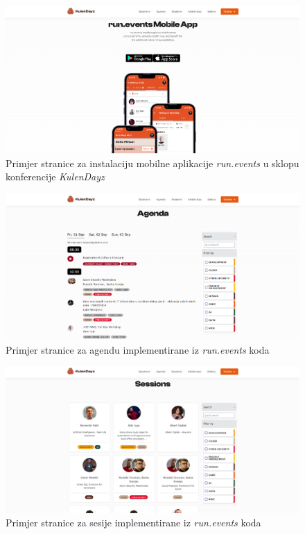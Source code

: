 		\begin{figure}
			\centering
			\includegraphics[width=1\linewidth]{slike/kulen-runevents.png}
			\caption{Primjer stranice za instalaciju mobilne aplikacije \textit{run.events} u sklopu konferencije \textit{KulenDayz}}
			\label{fig:kulen-run}
		\end{figure}
		
		\begin{figure}
			\centering
			\includegraphics[width=1\linewidth]{slike/kulen-agenda.png}
			\caption{Primjer stranice za agendu implementirane iz \textit{run.events} koda}
			\label{fig:kulen-agenda}
		\end{figure}
		
		\begin{figure}
			\centering
			\includegraphics[width=1\linewidth]{slike/kulen-sessions.png}
			\caption{Primjer stranice za sesije implementirane iz \textit{run.events} koda}
			\label{fig:kulen-sessions}
		\end{figure}
		
